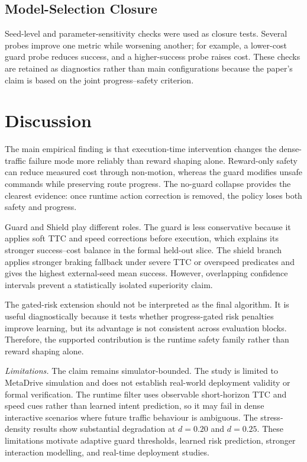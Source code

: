 \documentclass[conference,a4paper]{IEEEtran}
\begin{document}
\subsection{Model-Selection Closure}
Seed-level and parameter-sensitivity checks were used as closure tests. Several probes improve one metric while worsening another; for example, a lower-cost guard probe reduces success, and a higher-success probe raises cost. These checks are retained as diagnostics rather than main configurations because the paper's claim is based on the joint progress--safety criterion.
\FloatBarrier

\section{Discussion}
The main empirical finding is that execution-time intervention changes the dense-traffic failure mode more reliably than reward shaping alone. Reward-only safety can reduce measured cost through non-motion, whereas the guard modifies unsafe commands while preserving route progress. The no-guard collapse provides the clearest evidence: once runtime action correction is removed, the policy loses both safety and progress.

Guard and Shield play different roles. The guard is less conservative because it applies soft TTC and speed corrections before execution, which explains its stronger success--cost balance in the formal held-out slice. The shield branch applies stronger braking fallback under severe TTC or overspeed predicates and gives the highest external-seed mean success. However, overlapping confidence intervals prevent a statistically isolated superiority claim.

The gated-risk extension should not be interpreted as the final algorithm. It is useful diagnostically because it tests whether progress-gated risk penalties improve learning, but its advantage is not consistent across evaluation blocks. Therefore, the supported contribution is the runtime safety family rather than reward shaping alone.

\textit{Limitations.} The claim remains simulator-bounded. The study is limited to MetaDrive simulation and does not establish real-world deployment validity or formal verification. The runtime filter uses observable short-horizon TTC and speed cues rather than learned intent prediction, so it may fail in dense interactive scenarios where future traffic behaviour is ambiguous. The stress-density results show substantial degradation at $d=0.20$ and $d=0.25$. These limitations motivate adaptive guard thresholds, learned risk prediction, stronger interaction modelling, and real-time deployment studies.
\end{document}

